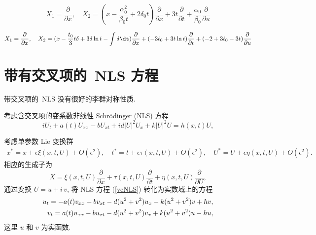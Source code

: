 $$X_1=\frac{\partial}{\partial x},\quad X_2=(x-\frac{\alpha_0^2}{\beta_0 t}+2\delta_0 t)\frac{\partial}{\partial x}+3t\frac{\partial}{\partial t}+\frac{\alpha_0}{\beta_0}\frac{\partial}{\partial u}$$

$$X_1=\frac{\partial}{\partial x},\quad
X_2=(x-\frac{t_0}{3}t\delta+3\delta\ln t-\int \delta\dt)\frac{\partial}{\partial x}+(-3t_0+3t\ln t)\frac{\partial}{\partial t}+(-2+3t_0-3t)\frac{\partial}{\partial u}$$



\section{带有交叉项的~NLS 方程}

带交叉项的~NLS 没有很好的李群对称性质.

考虑含交叉项的变系数非线性 Schr\"{o}dinger (NLS) 方程
\begin{equation}\label{vcNLS}
i U_t+a(t)U_{xx}-b U_{xt}+i d|U|^2U_x+k |U|^2U=h(x,t)U,
\end{equation}

考虑单参数 Lie 变换群
\begin{align}\label{Lie-T}
x^*=x+\epsilon \xi(x,t,U)+O(\epsilon^2),\quad t^*= t+\epsilon \tau(x,t,U)+O(\epsilon^2),\quad U^*= U+\epsilon \eta(x,t,U)+O(\epsilon^2).
\end{align}
相应的生成子为
\begin{equation}
X=\xi(x,t,U)\frac{\partial}{\partial x}+\tau(x,t,U)\frac{\partial}{\partial t}+\eta(x,t,U)\frac{\partial}{\partial U},
\end{equation}
通过变换 $U=u+i\,v$, 将 NLS 方程 (\ref{vcNLS}) 转化为实数域上的方程
\begin{align}\label{real-NLS}
u_t=-a(t)v_{xx}+bv_{xt}-d(u^2+v^2)u_x-k(u^2+v^2)v+hv,\notag\\
v_t=a(t)u_{xx}-bu_{xt}-d(u^2+v^2)v_x+k(u^2+v^2)u-hu,
\end{align}
这里 $u$ 和 $v$ 为实函数.

